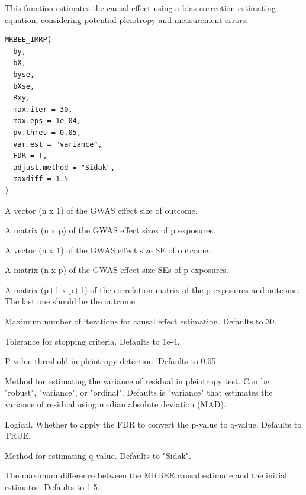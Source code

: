 \documentclass[a4paper]{book}
\begin{document}
%
\begin{Description}
This function estimates the causal effect using a bias-correction estimating equation, considering potential pleiotropy and measurement errors.
\end{Description}
%
\begin{Usage}
\begin{verbatim}
MRBEE_IMRP(
  by,
  bX,
  byse,
  bXse,
  Rxy,
  max.iter = 30,
  max.eps = 1e-04,
  pv.thres = 0.05,
  var.est = "variance",
  FDR = T,
  adjust.method = "Sidak",
  maxdiff = 1.5
)
\end{verbatim}
\end{Usage}
%
\begin{Arguments}
\begin{ldescription}
\item[\code{by}] A vector (n x 1) of the GWAS effect size of outcome.

\item[\code{bX}] A matrix (n x p) of the GWAS effect sizes of p exposures.

\item[\code{byse}] A vector (n x 1) of the GWAS effect size SE of outcome.

\item[\code{bXse}] A matrix (n x p) of the GWAS effect size SEs of p exposures.

\item[\code{Rxy}] A matrix (p+1 x p+1) of the correlation matrix of the p exposures and outcome. The last one should be the outcome.

\item[\code{max.iter}] Maximum number of iterations for causal effect estimation. Defaults to 30.

\item[\code{max.eps}] Tolerance for stopping criteria. Defaults to 1e-4.

\item[\code{pv.thres}] P-value threshold in pleiotropy detection. Defaults to 0.05.

\item[\code{var.est}] Method for estimating the variance of residual in pleiotropy test. Can be "robust", "variance", or "ordinal". Defaults is "variance" that estimates the variance of residual using median absolute deviation (MAD).

\item[\code{FDR}] Logical. Whether to apply the FDR to convert the p-value to q-value. Defaults to TRUE.

\item[\code{adjust.method}] Method for estimating q-value. Defaults to "Sidak".

\item[\code{maxdiff}] The maximum difference between the MRBEE causal estimate and the initial estimator. Defaults to 1.5.
\end{ldescription}
\end{Arguments}
\end{document}
